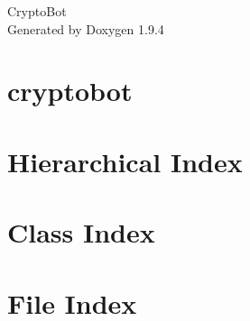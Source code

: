 \documentclass[twoside]{book}
\newcommand{\+}{\discretionary{\mbox{\scriptsize$\hookleftarrow$}}{}{}}
\newcommand{\clearemptydoublepage}{%
    \newpage{\pagestyle{empty}\cleardoublepage}%
  }
\begin{document}
  \raggedbottom
    \hypersetup{pageanchor=false,
                bookmarksnumbered=true,
                pdfencoding=unicode
               }
  \begin{titlepage}
  \vspace*{7cm}
  \begin{center}%
  {\Large Crypto\+Bot}\\
  \vspace*{1cm}
  {\large Generated by Doxygen 1.9.4}\\
  \end{center}
  \end{titlepage}
  \clearemptydoublepage
  \tableofcontents
  \clearemptydoublepage
  \hypersetup{pageanchor=true}
\chapter{cryptobot}
\label{index}\hypertarget{index}{}
\chapter{Hierarchical Index}

\chapter{Class Index}

\chapter{File Index}

\end{document}
